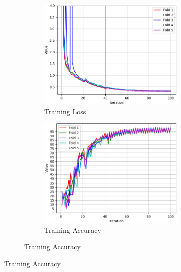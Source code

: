 \begin{figure}[ht]
    \begin{subfigure}{\textwidth}
        \centering
        \begin{subfigure}{0.32\textwidth}
            \includegraphics[width=\linewidth]{Images/training/BU3DFE_7_train_loss.png}
            \caption{Training Loss}
            \label{BU3DFE_7_train_loss}
        \end{subfigure}
        \begin{subfigure}{0.32\textwidth}
            \includegraphics[width=\linewidth]{Images/training/BU3DFE_7_train_acc.png}
            \caption{Training Accuracy}
            \label{BU3DFE_7_train_acc}
        \end{subfigure}

\end{subfigure}
\end{figure}
